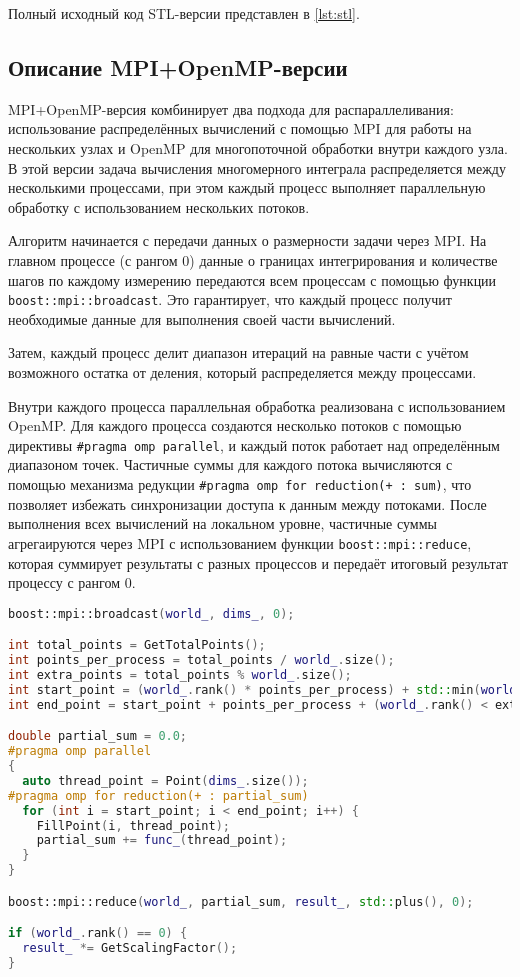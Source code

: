 \documentclass[a4paper,12pt]{article}
\begin{document}
  Полный исходный код STL-версии представлен в \autoref{lst:stl}.

  \subsection{Описание MPI+OpenMP-версии}\label{subsec:mpi_openmp_impl}

  MPI+OpenMP-версия комбинирует два подхода для распараллеливания: использование распределённых вычислений с помощью MPI для работы на нескольких узлах и OpenMP для многопоточной обработки внутри каждого узла.
  В этой версии задача вычисления многомерного интеграла распределяется между несколькими процессами, при этом каждый процесс выполняет параллельную обработку с использованием нескольких потоков.

  Алгоритм начинается с передачи данных о размерности задачи через MPI. На главном процессе (с рангом 0) данные о границах интегрирования и количестве шагов по каждому измерению передаются всем процессам с помощью функции \texttt{boost::mpi::broadcast}.
  Это гарантирует, что каждый процесс получит необходимые данные для выполнения своей части вычислений.

  Затем, каждый процесс делит диапазон итераций на равные части с учётом возможного остатка от деления, который распределяется между процессами.

  Внутри каждого процесса параллельная обработка реализована с использованием OpenMP. Для каждого процесса создаются несколько потоков с помощью директивы \texttt{\#pragma omp parallel}, и каждый поток работает над определённым диапазоном точек.
  Частичные суммы для каждого потока вычисляются с помощью механизма редукции \texttt{\#pragma omp for reduction(+ : sum)}, что позволяет избежать синхронизации доступа к данным между потоками.
  После выполнения всех вычислений на локальном уровне, частичные суммы агрегаируются через MPI с использованием функции \texttt{boost::mpi::reduce}, которая суммирует результаты с разных процессов и передаёт итоговый результат процессу с рангом 0.

  \begin{lstlisting}[language=C++, caption=Ключевой фрагмент MPI+OpenMP-версии,label={lst:mpi+openmp-fragment}]
boost::mpi::broadcast(world_, dims_, 0);

int total_points = GetTotalPoints();
int points_per_process = total_points / world_.size();
int extra_points = total_points % world_.size();
int start_point = (world_.rank() * points_per_process) + std::min(world_.rank(), extra_points);
int end_point = start_point + points_per_process + (world_.rank() < extra_points ? 1 : 0);

double partial_sum = 0.0;
#pragma omp parallel
{
  auto thread_point = Point(dims_.size());
#pragma omp for reduction(+ : partial_sum)
  for (int i = start_point; i < end_point; i++) {
    FillPoint(i, thread_point);
    partial_sum += func_(thread_point);
  }
}

boost::mpi::reduce(world_, partial_sum, result_, std::plus(), 0);

if (world_.rank() == 0) {
  result_ *= GetScalingFactor();
}
  \end{lstlisting}
\end{document}
